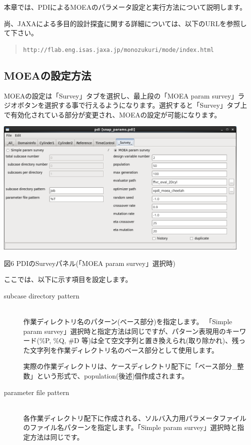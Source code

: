 \documentclass[a4paper,11pt]{jarticle}
\begin{document}
{本章では、PDIによるMOEAのパラメータ設定と実行方法について説明します。

尚、JAXAによる多目的設計探査に関する詳細については、以下のURLを参照して下さい。
\begin{quote}
{\tt http://flab.eng.isas.jaxa.jp/monozukuri/mode/index.html}
\end{quote}


\subsection{MOEAの設定方法}

MOEAの設定は「Survey」タブを選択し、最上段の「MOEA param survey」ラジオボタンを選択する事で行えるようになります。選択すると「Survey」タブ上で有効化されている部分が変更され、MOEAの設定が可能になります。

\begin{center}
\includegraphics[width=360pt, bb=0 0 984 520]{figs/fig005.png}

図6 PDIのSurveyパネル(「MOEA param survey」選択時)
\end{center}

ここでは、以下に示す項目を設定します。

\begin{description}
\item[subcase directory pattern] {\ }\\
作業ディレクトリ名のパターン(ベース部分)を指定します。
「Simple param survey」選択時と指定方法は同じですが、パターン表現用のキーワード(\%P, \%Q, \#D 等)は全て空文字列と置き換えられ(取り除かれ)、残った文字列を作業ディレクトリ名のベース部分として使用します。

実際の作業ディレクトリは、ケースディレクトリ配下に「ベース部分\_整数」という形式で、population(後述)個作成されます。\\

\item[parameter file pattern] {\ }\\
各作業ディレクトリ配下に作成される、ソルバ入力用パラメータファイルのファイル名パターンを指定します。「Simple param survey」選択時と指定方法は同じです。\\


\end{description}}
\end{document}
